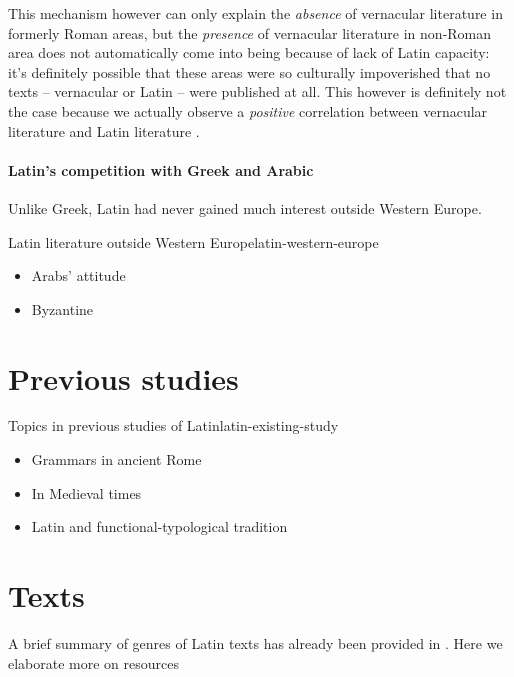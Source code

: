 \documentclass[a4paper, oneside, 12pt]{report}
\newcommand*{\citepages}[1]{pp.~{#1}}
\begin{document}
This mechanism however can only explain the \emph{absence} of vernacular literature in formerly Roman areas,
but the \emph{presence} of vernacular literature in non-Roman area 
does not automatically come into being because of lack of Latin capacity:
it's definitely possible that these areas were so culturally impoverished 
that no texts -- vernacular or Latin -- were published at all.
This however is definitely not the case 
because we actually observe a \emph{positive} correlation 
between vernacular literature and Latin literature
\citep[\citepages{167-168}]{leonhardt2013latin}.

\paragraph*{Latin's competition with Greek and Arabic}

Unlike Greek, Latin had never gained much interest outside Western Europe.

\begin{infobox}{Latin literature outside Western Europe}{latin-western-europe}
    \begin{itemize}
        \item Arabs' attitude 
        \item Byzantine
    \end{itemize}
\end{infobox}

\section{Previous studies}

\begin{todobox}{Topics in previous studies of Latin}{latin-existing-study}
    \begin{itemize}
        \item Grammars in ancient Rome 
        \item In Medieval times
        \item Latin and functional-typological tradition
    \end{itemize}
\end{todobox}

\section{Texts}

A brief summary of genres of Latin texts has already been provided in .
Here we elaborate more on resources
\end{document}
